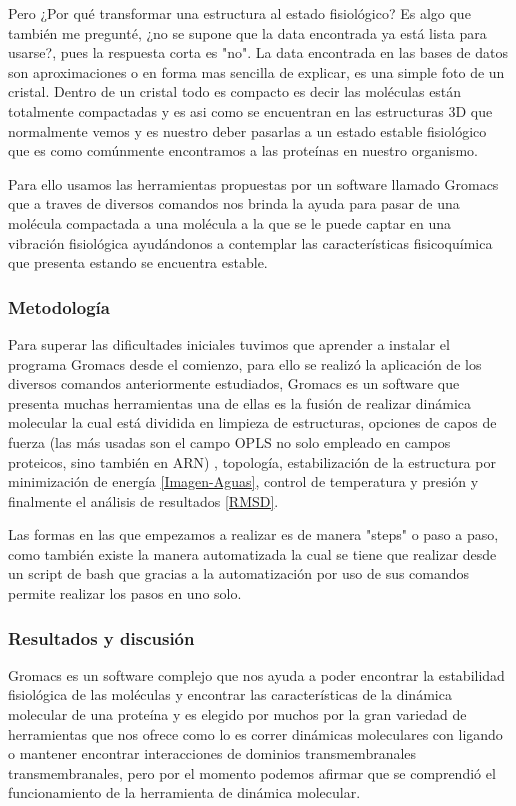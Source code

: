 \documentclass[a4paper,12pt]{article}
\begin{document}
         Pero ¿Por qué transformar una estructura al estado fisiológico? Es algo que también me pregunté, ¿no se supone que la data encontrada ya está lista para usarse?, pues la respuesta corta es "no". La data encontrada en las bases de datos son aproximaciones o en forma mas sencilla de explicar, es una simple foto de un cristal. Dentro de un cristal todo es compacto es decir las moléculas están totalmente compactadas y es asi como se encuentran en las estructuras 3D que normalmente vemos y es nuestro deber pasarlas a un estado estable fisiológico que es como comúnmente encontramos a las proteínas en nuestro organismo.
         
         Para ello usamos las herramientas propuestas por un software llamado Gromacs que a traves de diversos comandos nos brinda la ayuda para pasar de una molécula compactada a una molécula a la que se le puede captar en una vibración fisiológica ayudándonos a contemplar las características fisicoquímica que presenta estando se encuentra estable.

         \subsubsection{Metodología}
         Para superar las dificultades iniciales tuvimos que aprender a instalar el programa Gromacs desde el comienzo, para ello se realizó la aplicación de los diversos comandos anteriormente estudiados, Gromacs es un software que presenta muchas herramientas una de ellas es la fusión de realizar dinámica molecular la cual está dividida en limpieza de estructuras, opciones de capos de fuerza (las más usadas son el campo OPLS no solo empleado en campos proteicos, sino también en ARN)
         , topología, estabilización de la estructura por minimización de energía \ref{Imagen-Aguas}, control de temperatura y presión y finalmente  el análisis de resultados \ref{RMSD}.

         Las formas en las que empezamos a realizar es de manera "steps" o paso a paso, como también existe la manera automatizada la cual se tiene que realizar desde un script de bash que gracias a la automatización por uso de sus comandos permite realizar los pasos en uno solo.
         
         \subsubsection{Resultados y discusión}
         Gromacs es un software complejo que nos ayuda a poder encontrar la estabilidad fisiológica de las moléculas y encontrar las características de la dinámica molecular de una proteína y es elegido por muchos por la gran variedad de herramientas que nos ofrece como lo es correr dinámicas moleculares con ligando o mantener encontrar interacciones de dominios transmembranales transmembranales, pero por el momento podemos afirmar que se comprendió el funcionamiento de la herramienta de dinámica molecular.
\end{document}
